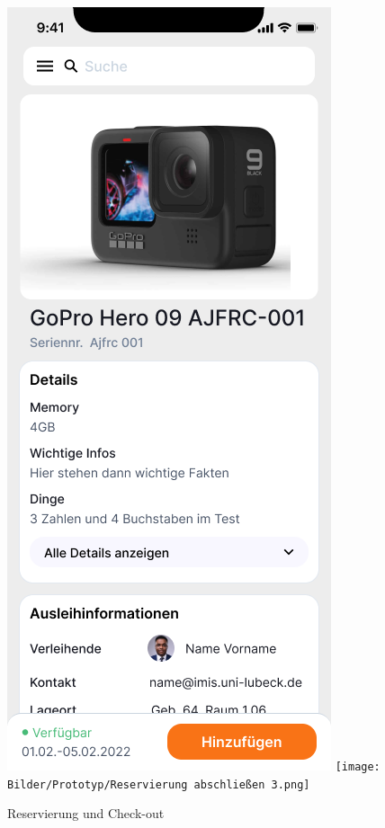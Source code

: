 \begin{figure}[h]
    \centering
    \includegraphics[scale=0.3]{Bilder/Prototyp/Neu/Datailansicht-1.png}\hspace{2em}
    \texttt{[image: Bilder/Prototyp/Reservierung abschließen 3.png]}
    \caption[Reservierung und Check-out]{Reservierung und Check-out}
    \label{fig:p3}
\end{figure}